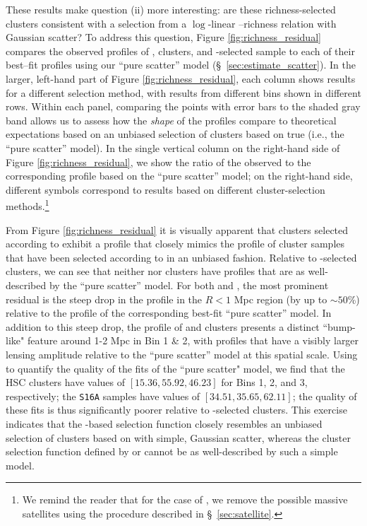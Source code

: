 \documentclass[fleqn,usenatbib,useAMS]{mnras}
\begin{document}
    These results make question (ii) more interesting: are these richness-selected clusters
    consistent with a selection from a $\log$-linear \mvir{}--richness relation with Gaussian
    scatter? 
    To address this question, Figure \ref{fig:richness_residual} compares the observed \dsigma{}
    profiles of \redm{}, \camira{} clusters, and -selected sample to each of their
    best--fit profiles using our ``pure scatter'' model (\S\ \ref{sec:estimate_scatter}). 
    In the larger, left-hand part of Figure \ref{fig:richness_residual}, each column shows results
    for a different \topn{} selection method, with results from different bins shown in different
    rows. 
    Within each panel, comparing the points with error bars to the shaded gray band allows us to 
    assess how the {\em shape} of the \dsigma{} profiles compare to theoretical expectations based
    on an unbiased selection of clusters based on true \mvir{} (i.e., the ``pure scatter'' model).
    In the single vertical column on the right-hand side of Figure \ref{fig:richness_residual}, we
    show the ratio of the observed \dsigma{} to the corresponding profile based on the ``pure
    scatter'' model; on the right-hand side, different symbols correspond to results based on
    different cluster-selection methods.\footnote{We remind the reader that for the case of
    , we remove the possible massive satellites using the procedure described in \S\
    \ref{sec:satellite}.}    

    From Figure \ref{fig:richness_residual} it is visually apparent that clusters selected according
    to \menve{50}{100} exhibit a \dsigma{} profile that closely mimics the profile of cluster
    samples that have been selected according to \mvir{} in an unbiased fashion. 
    Relative to \menve{50}{100}-selected clusters, we can see that neither \redm{} nor \camira{}
    clusters have \dsigma{} profiles that are as well-described by the ``pure scatter'' model.
    For both \redm{} and \camira{}, the most prominent residual  is the steep drop in the profile in
    the $R < 1$ Mpc region (by up to $\sim 50$\%) relative to the profile of the corresponding
    best-fit ``pure scatter'' model. 
    In addition to this steep drop, the \dsigma{} profile of \redm{} and \camira{} clusters presents
    a distinct ``bump-like" feature around 1-2 Mpc in Bin 1 \& 2, with profiles that have a visibly
    larger lensing amplitude relative to the ``pure scatter'' model at this spatial scale.  
    Using \chisq{} to quantify the quality of the fits of the ``pure scatter" model, we find that
    the HSC \redm{} clusters have values of $[15.36, 55.92, 46.23]$ for Bins 1, 2, and 3,
    respectively; the \camira{} \texttt{S16A} samples have values of $[34.51, 35.65, 62.11]$; the
    quality of these fits is thus significantly poorer relative to \menve{50}{100}-selected
    clusters. 
    This exercise indicates that the -based selection function closely resembles an
    unbiased selection of clusters based on \mvir{} with simple, Gaussian scatter, whereas the
    cluster selection function defined by \redm{} or \camira{} cannot be as well-described by such a
    simple model.
    
\end{document}
